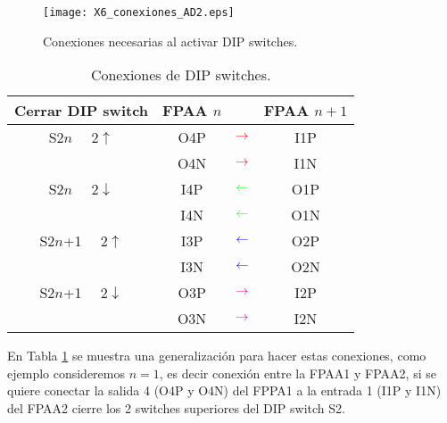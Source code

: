 	\begin{figure}[!h]
		\caption{Conexiones necesarias al activar DIP switches.}
		\label{fig:X6_conexiones_AD2}
		\centering
		\texttt{[image: X6\_conexiones\_AD2.eps]}
	\end{figure}
	
	\begin{table}[!ht]                                      
		\centering   
		\caption{Conexiones de DIP switches.}                            
		\label{tab:DIP_switches_code}                                       
			\begin{tabular}{c c c c}                        
			\hline                                              
			Cerrar DIP switch & FPAA $n$ & & FPAA $n+1$\\            
			\hline       
			{\color{red} S$2n$ $\quad2\uparrow$}  &{\color{red} O4P} & ${\color{red} \rightarrow}$& {\color{red} I1P}\\  
											&{\color{red} O4N} & ${\color{red} \rightarrow}$& {\color{red} I1N}\\ 
			{\color{green} S$2n$ $\quad2\downarrow$}&{\color{green} I4P} & ${\color{green} \leftarrow}$& {\color{green} O1P}\\  
											&{\color{green} I4N} & ${\color{green} \leftarrow}$& {\color{green} O1N}\\  
			                                
			{\color{blue} S$2n$+1 $\quad2\uparrow$} &{\color{blue} I3P} & ${\color{blue} \leftarrow}$& {\color{blue} O2P}\\  
			 								&{\color{blue} I3N} & ${\color{blue} \leftarrow}$& {\color{blue} O2N}\\
			{\color{magenta} S$2n$+1 $\quad2\downarrow$}&{\color{magenta} O3P} & ${\color{magenta} \rightarrow}$& {\color{magenta} I2P}\\  
											&{\color{magenta} O3N} & ${\color{magenta} \rightarrow}$& {\color{magenta} I2N}\\ 
			\hline                                 
			\end{tabular}                                                             
	\end{table}
	
	En Tabla \ref{tab:DIP_switches_code} se muestra una generalización para hacer estas conexiones, como ejemplo consideremos $n = 1$, es decir conexión entre la FPAA1 y FPAA2, si se quiere conectar la salida 4 (O4P y O4N) del FPPA1 a la entrada 1 (I1P y I1N) del FPAA2 cierre los 2 switches superiores del DIP switch S2.
